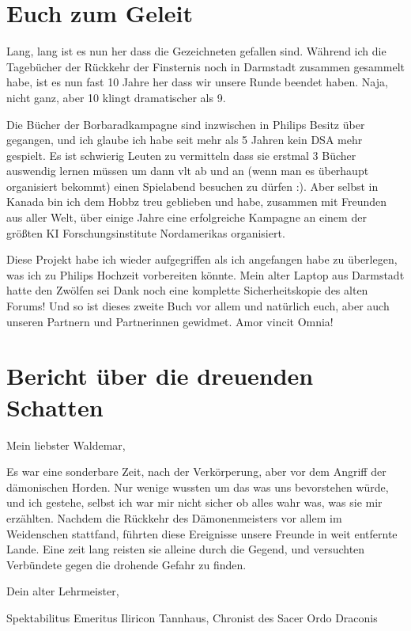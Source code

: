 \chapter{Euch zum Geleit}
Lang, lang ist es nun her dass die Gezeichneten gefallen sind. Während ich die Tagebücher der Rückkehr der Finsternis noch in Darmstadt zusammen gesammelt habe, ist es nun fast 10 Jahre her dass wir unsere Runde beendet haben. Naja, nicht ganz, aber 10 klingt dramatischer als 9.

Die Bücher der Borbaradkampagne sind inzwischen in Philips Besitz über gegangen, und ich glaube ich habe seit mehr als 5 Jahren kein DSA mehr gespielt. Es ist schwierig Leuten zu vermitteln dass sie erstmal 3 Bücher auswendig lernen müssen um dann vlt ab und an (wenn man es überhaupt organisiert bekommt) einen Spielabend besuchen zu dürfen :). Aber selbst in Kanada bin ich dem Hobbz treu geblieben und habe, zusammen mit Freunden aus aller Welt, über einige Jahre eine erfolgreiche Kampagne an einem der größten KI Forschungsinstitute Nordamerikas organisiert.

Diese Projekt habe ich wieder aufgegriffen als ich angefangen habe zu überlegen, was ich zu Philips Hochzeit vorbereiten könnte. Mein alter Laptop aus Darmstadt hatte den Zwölfen sei Dank noch eine komplette Sicherheitskopie des alten Forums! Und so ist dieses zweite Buch vor allem und natürlich euch, aber auch unseren Partnern und Partnerinnen gewidmet. Amor vincit Omnia!

\chapter{Bericht über die dreuenden Schatten}


Mein liebster Waldemar,

Es war eine sonderbare Zeit, nach der Verkörperung, aber vor dem Angriff der dämonischen Horden.
Nur wenige wussten um das was uns bevorstehen würde, und ich gestehe, selbst ich war mir nicht sicher ob alles wahr was, was sie mir erzählten.
Nachdem die Rückkehr des Dämonenmeisters vor allem im Weidenschen stattfand, führten diese Ereignisse unsere Freunde in weit entfernte Lande.
Eine zeit lang reisten sie alleine durch die Gegend, und versuchten Verbündete gegen die drohende Gefahr zu finden.

Dein alter Lehrmeister,\par
Spektabilitus Emeritus Iliricon Tannhaus, Chronist des Sacer Ordo Draconis



